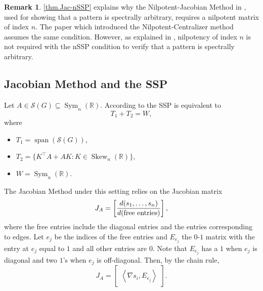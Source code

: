 \documentclass{article}
\theoremstyle{definition}
\newtheorem{remark}[theorem]{Remark}
\newcommand{\trans}{^\top}
\newcommand{\inp}[2]{\left\langle#1,#2\right\rangle}
\newcommand{\vspan}{\operatorname{span}}
\newcommand{\msym}[1][n]{\operatorname{Sym}_{#1}(\mathbb{R})}
\newcommand{\mskew}[1][n]{\operatorname{Skew}_{#1}(\mathbb{R})}
\newcommand{\mptn}{\mathcal{S}}
\begin{document}
\begin{remark}
\cref{thm.Jac-nSSP} explains why the Nilpotent-Jacobian Method in \cite{DJOvdD00}, used  for showing that a pattern is spectrally arbitrary, requires a nilpotent matrix of index $n$.  The paper \cite{GB13} which introduced the Nilpotent-Centralizer method  assumes the same condition.  However,  as explained in \cite{bifur},  nilpotency of index $n$ is not required with the nSSP condition to verify that a pattern is spectrally arbitrary.
\end{remark}

\subsection{Jacobian Method and the SSP}

Let $A\in\mptn(G)\subseteq\msym$.  According to \cite[Proposition~1.1]{bifur} the SSP is equivalent to 
\[T_1 + T_2 = W,\]
where
\begin{itemize}
    \item $T_1 = \vspan(\mptn(G))$, 
    \item $T_2 = \{K\trans A + AK: K\in\mskew\}$, 
    \item $W = \msym$.
\end{itemize}

The Jacobian Method under this setting relies on the Jacobian matrix 
\[
    J_A = \begin{bmatrix}
        \displaystyle{\frac{d(s_1,\ldots, s_n)}{d({\rm free\ entries})}}
    \end{bmatrix},
\]
where the free entries include the diagonal entries and the entries corresponding to edges.  
Let $e_j$ be the indices of the free entries and $E_{e_j}$ the $0$-$1$ matrix with the entry at $e_j$ equal to $1$ and all other entries are $0$.  Note that $E_{e_j}$ has a $1$ when $e_j$ is diagonal and two $1$'s when $e_j$ is off-diagonal.  Then, by the chain rule, 
\[
    J_A = \begin{bmatrix}
        \inp{\nabla s_i}{E_{e_j}}
    \end{bmatrix}.
\]
\end{document}
